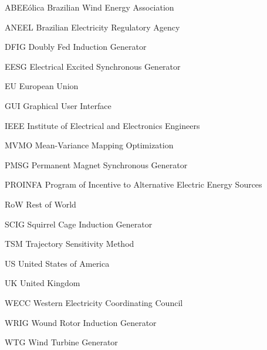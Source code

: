 \documentclass[
12pt,		%
openright,	%
twoside,  %
a4paper,			%
chapter=TITLE,		%
brazil,				%
french,				%
spanish,			%
english				%
]{USPSC}
\begin{document}
\listoftables*
\cleardoublepage


\begin{siglas}
    \item[ABEE\'olica] Brazilian Wind Energy Association
    \item[ANEEL] Brazilian Electricity Regulatory Agency
    \item[DFIG] Doubly Fed Induction Generator
    \item[EESG] Electrical Excited Synchronous Generator
    \item[EU] European Union
    \item[GUI] Graphical User Interface
	\item[IEEE] Institute of Electrical and Electronics Engineers
	\item[MVMO] Mean-Variance Mapping Optimization	
	\item[PMSG] Permanent Magnet Synchronous Generator
    \item[PROINFA] Program of Incentive to Alternative Electric Energy Sources
    \item[RoW] Rest of World
    \item[SCIG] Squirrel Cage Induction Generator
    \item[TSM] Trajectory Sensitivity Method
    \item[US] United States of America
    \item[UK] United Kingdom
    \item[WECC] Western Electricity Coordinating Council
    \item[WRIG] Wound Rotor Induction Generator
    \item[WTG] Wind Turbine Generator

	
\end{siglas}

\tableofcontents*
\cleardoublepage
\textual
\end{document}
